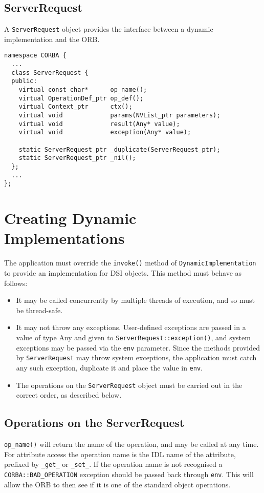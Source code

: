 \documentclass[11pt,twoside,onecolumn]{book}
\begin{document}
\subsection{ServerRequest}

A {\tt ServerRequest} object provides the interface between a dynamic
implementation and the ORB.

{\small \begin{verbatim}
namespace CORBA {
  ...
  class ServerRequest {
  public:
    virtual const char*      op_name();
    virtual OperationDef_ptr op_def();
    virtual Context_ptr      ctx();
    virtual void             params(NVList_ptr parameters);
    virtual void             result(Any* value);
    virtual void             exception(Any* value);

    static ServerRequest_ptr _duplicate(ServerRequest_ptr);
    static ServerRequest_ptr _nil();
  };
  ...
};
\end{verbatim}}


\section{Creating Dynamic Implementations}

The application must override the {\tt invoke()} method of
{\tt DynamicImplementation} to provide an implementation for DSI objects.
This method must behave as follows:

\begin{itemize}
\item It may be called concurrently by multiple threads of execution, and
so must be thread-safe.
\item It may not throw any exceptions. User-defined exceptions are passed
in a value of type Any and given to
{\tt ServerRequest::exception()}, and system exceptions may be
passed via the {\tt env} parameter. Since the methods provided by
{\tt ServerRequest} may throw system exceptions, the application must catch
any such exception, duplicate it and place the value in {\tt env}.
\item The operations on the {\tt ServerRequest} object must be carried out
in the correct order, as described below.
\end{itemize}


\subsection{Operations on the ServerRequest}

{\tt op\_name()} will return the name of the operation, and may be called at
any time. For attribute access the operation name is the IDL name of the
attribute, prefixed by {\tt \_get\_} or {\tt \_set\_}. If the operation name
is not recognised a {\tt CORBA::BAD\_OPERATION} exception should be passed
back through {\tt env}. This will allow the ORB to then see if it is one of
the standard object operations.
\end{document}
